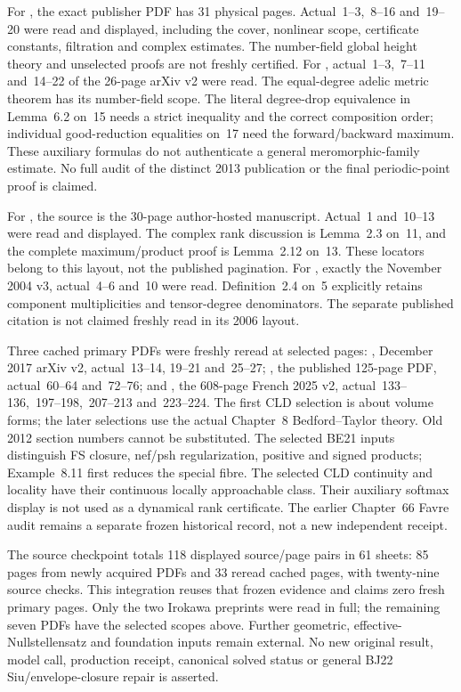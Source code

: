 For \cite{Kawaguchi13RegularPublished}, the exact publisher PDF
has 31 physical pages. Actual~1--3,~8--16 and~19--20 were read
and displayed, including the cover, nonlinear scope, certificate
constants, filtration and complex estimates. The number-field global
height theory and unselected proofs are not freshly certified.
For \cite{Lee12RegularPairV2}, actual~1--3,~7--11 and~14--22
of the 26-page arXiv v2 were read. The equal-degree adelic metric
theorem has its number-field scope. The literal degree-drop
equivalence in Lemma~6.2 on~15 needs a strict inequality and the
correct composition order; individual good-reduction equalities on~17
need the forward/backward maximum. These auxiliary formulas do
not authenticate a general meromorphic-family estimate. No full
audit of the distinct 2013 publication or the final periodic-point
proof is claimed.

For \cite{GuedjSibony02Author}, the source is the 30-page
author-hosted manuscript. Actual~1 and~10--13 were read and
displayed. The complex rank discussion is Lemma~2.3 on~11,
and the complete maximum/product proof is Lemma~2.12 on~13.
These locators belong to this layout, not the published pagination.
For \cite{CL04MeasuresV3}, exactly the November 2004 v3,
actual~4--6 and~10 were read. Definition~2.4 on~5 explicitly
retains component multiplicities and tensor-degree denominators.
The separate published citation \cite{CL06} is not claimed
freshly read in its 2006 layout.

Three cached primary PDFs were freshly reread at selected pages:
\cite{Favre20Hybrid}, December 2017 arXiv v2, actual~13--14,
19--21 and~25--27; \cite{BE21}, the published 125-page PDF,
actual~60--64 and~72--76; and \cite{CLD25}, the 608-page French
2025 v2, actual~133--136,~197--198,~207--213 and~223--224.
The first CLD selection is about volume forms; the later selections
use the actual Chapter~8 Bedford--Taylor theory. Old 2012 section
numbers cannot be substituted. The selected BE21 inputs distinguish
FS closure, nef/psh regularization, positive and signed products;
Example~8.11 first reduces the special fibre. The selected CLD
continuity and locality have their continuous locally approachable
class. Their auxiliary softmax display is not used as a dynamical
rank certificate. The earlier Chapter~66 Favre audit remains a
separate frozen historical record, not a new independent receipt.

The source checkpoint totals 118 displayed source/page pairs in
61 sheets: 85 pages from newly acquired PDFs and 33 reread cached
pages, with twenty-nine source checks. This integration reuses that
frozen evidence and claims zero fresh primary pages. Only the two
Irokawa preprints were read in full; the remaining seven PDFs have
the selected scopes above. Further geometric, effective-Nullstellensatz
and foundation inputs remain external. No new original result,
model call, production receipt, canonical solved status or general
BJ22 Siu/envelope-closure repair is asserted.

